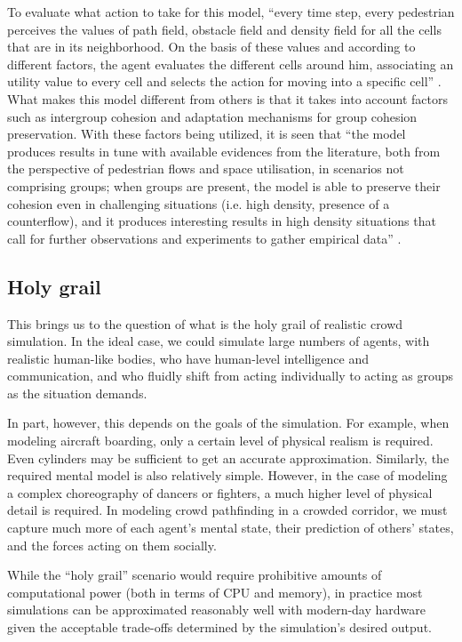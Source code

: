 \documentclass[tog]{acmsiggraph}
\begin{document}
To evaluate what action to take for this model, ``every time step, every pedestrian perceives the values of path field, obstacle field and density field for all the cells that are in its neighborhood. On the basis of these values and according to different factors, the agent evaluates the different cells around him, associating an utility value to every cell and selects the action for moving into a specific cell'' \cite{vizzari2013adaptiveped}.  What makes this model different from others is that it takes into account factors such as intergroup cohesion and adaptation mechanisms for group cohesion preservation.  With these factors being utilized, it is seen that ``the model produces results in tune with available evidences from the literature, both from the perspective of pedestrian flows and space utilisation, in scenarios not comprising groups; when groups are present, the model is able to preserve their cohesion even in challenging situations (i.e. high density, presence of a counterflow), and it produces interesting results in high density situations that call for further observations and experiments to gather empirical data'' \cite{vizzari2013adaptiveped}.

\subsection{Holy grail}


%
%

This brings us to the question of what is the holy grail of realistic crowd simulation. In the ideal case, we could simulate large numbers of agents, with realistic human-like bodies, who have human-level intelligence and communication, and who fluidly shift from acting individually to acting as groups as the situation demands.

In part, however, this depends on the goals of the simulation. For example, when modeling aircraft boarding, only a certain level of physical realism is required. Even cylinders may be sufficient to get an accurate approximation. Similarly, the required mental model is also relatively simple. However, in the case of modeling a complex choreography of dancers or fighters, a much higher level of physical detail is required. In modeling crowd pathfinding in a crowded corridor, we must capture much more of each agent's mental state, their prediction of others' states, and the forces acting on them socially.

While the ``holy grail'' scenario would require prohibitive amounts of computational power (both in terms of CPU and memory), in practice most simulations can be approximated reasonably well with modern-day hardware given the acceptable trade-offs determined by the simulation's desired output.


\nocite{*}

\end{document}
